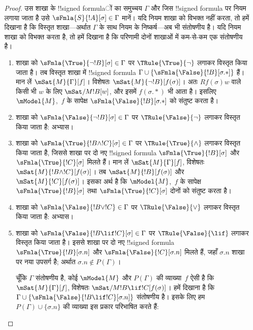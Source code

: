 \documentclass[../../../include/open-logic-section]{subfiles}
\begin{document}
\begin{proof}
उस शाखा के !!{signed formula}ों का समुच्चय $\Gamma$ और जिस !!{signed formula}
पर नियम लगाया जाता है उसे $\sFmla{S}{!A}[\sigma] \in \Gamma$ मानें। यदि
नियम शाखा को विभक्त नहीं करता, तो हमें दिखाना है कि विस्तृत शाखा---अर्थात
$\Gamma$ के साथ नियम के निष्कर्ष---अब भी संतोषणीय है। यदि नियम शाखा को
विभक्त करता है, तो हमें दिखाना है कि परिणामी दोनों शाखाओं में कम-से-कम एक
संतोषणीय है।
\begin{enumerate}
\item शाखा को $\sFmla{\True}{\lnot !B}[\sigma] \in \Gamma$ पर
  $\TRule{\True}{\lnot}$ लगाकर विस्तृत किया जाता है। तब विस्तृत शाखा में
  !!{signed formula} $\Gamma \cup
  \{\sFmla{\False}{!B}[\sigma.{*}]\}$ हैं। मान लें
  $\mSat{M}{\Gamma}[f]$। विशेषतः $\mSat{M}{\lnot !B}[f(\sigma)]$। अतः
  $Rf(\sigma)w$ वाले किसी भी $w$ के लिए $\mSat/{M}{!B}[w]$, और इसमें
  $f(\sigma.{*})$ भी आता है। इसलिए $\mModel{M}$,~$f$ के सापेक्ष
  $\sFmla{\False}{!B}[\sigma.{*}]$ को संतुष्ट करता है।
\item शाखा को $\sFmla{\False}{\lnot !B}[\sigma] \in \Gamma$ पर
  $\TRule{\False}{\lnot}$ लगाकर विस्तृत किया जाता है: अभ्यास।
\item शाखा को $\sFmla{\True}{!B \land !C}[\sigma] \in \Gamma$ पर
  $\TRule{\True}{\land}$ लगाकर विस्तृत किया जाता है, जिससे शाखा पर दो नए
  !!{signed formula} $\sFmla{\True}{!B}[\sigma]$ और
  $\sFmla{\True}{!C}[\sigma]$ मिलते हैं। मान लें
  $\mSat{M}{\Gamma}[f]$, विशेषतः
  $\mSat{M}{!B \land !C}[f(\sigma)]$। तब
  $\mSat{M}{!B}[f(\sigma)]$ और $\mSat{M}{!C}[f(\sigma)]$। इसका अर्थ है कि
  $\mModel{M}$,~$f$ के सापेक्ष $\sFmla{\True}{!B}[\sigma]$ तथा
  $\sFmla{\True}{!C}[\sigma]$ दोनों को संतुष्ट करता है।
\item शाखा को $\sFmla{\False}{!B \lor !C} \in \Gamma$ पर
  $\TRule{\False}{\lor}$ लगाकर विस्तृत किया जाता है: अभ्यास।
\item शाखा को $\sFmla{\False}{!B \lif !C}[\sigma] \in \Gamma$ पर
  $\TRule{\False}{\lif}$ लगाकर विस्तृत किया जाता है। इससे शाखा पर दो नए
  !!{signed formula} $\sFmla{\True}{!B}[\sigma.n]$ और
  $\sFmla{\False}{!C}[\sigma.n]$ मिलते हैं, जहाँ $\sigma.n$ शाखा पर नया
  उपसर्ग है; अर्थात $\sigma.n \notin P(\Gamma)$।
  
  चूँकि $\Gamma$ संतोषणीय है, कोई $\mModel{M}$ और $P(\Gamma)$ की
  व्याख्या~$f$ ऐसी है कि $\mSat{M}{\Gamma}[f]$, विशेषतः
  $\mSat/{M}{!B \lif !C}[f(\sigma)]$। हमें दिखाना है कि
  $\Gamma \cup \{\sFmla{\False}{!B \lif !C}[\sigma.n]\}$ संतोषणीय है।
  इसके लिए हम $P(\Gamma) \cup \{\sigma.n\}$ की व्याख्या इस प्रकार
  परिभाषित करते हैं:
  

\end{enumerate}
\end{proof}
\end{document}
